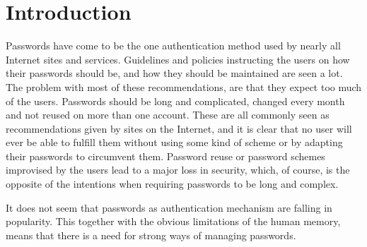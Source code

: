 \chapter{Introduction}
\label{chp:intro} 

Passwords have come to be the one authentication method used by nearly all Internet sites and services. Guidelines and policies instructing the users on how their passwords should be, and how they should be maintained are seen a lot. The problem with most of these recommendations, are that they expect too much of the users. Passwords should be long and complicated, changed every month and not reused on more than one account. These are all commonly seen as recommendations given by sites on the Internet, and it is clear that no user will ever be able to fulfill them without using some kind of scheme or by adapting their passwords to circumvent them. Password reuse or password schemes improvised by the users lead to a major loss in security, which, of course, is the opposite of the intentions when requiring passwords to be long and complex.  
\par It does not seem that passwords as authentication mechanism are falling in popularity. This together with the obvious limitations of the human memory, means that there is a need for strong ways of managing passwords. 


